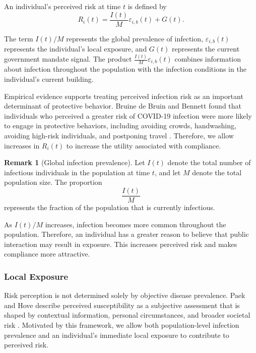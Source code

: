 \documentclass[11pt]{article}
\theoremstyle{definition}
\newtheorem{remark}{Remark}[section]
\theoremstyle{plain}
\begin{document}
An individual's perceived risk at time $t$ is defined by
\begin{equation}\label{eq:risk}
 R_i(t)=\frac{I(t)}{M}\varepsilon_{i,b}(t)+G(t).
\end{equation}

The term $I(t)/M$ represents the global prevalence of infection, $\varepsilon_{i,b}(t)$ represents the individual's local exposure, and $G(t)$ represents the current government mandate signal. The product $\frac{I(t)}{M}\varepsilon_{i,b}(t)$ combines information about infection throughout the population with the infection conditions in the individual's current building.

Empirical evidence supports treating perceived infection risk as an important
determinant of protective behavior. Bruine de Bruin and Bennett found that
individuals who perceived a greater risk of COVID-19 infection were more
likely to engage in protective behaviors, including avoiding crowds,
handwashing, avoiding high-risk individuals, and postponing travel
\cite{bruine2020}. Therefore, we allow increases in $R_i(t)$ to increase
the utility associated with compliance.

\begin{remark}[Global infection prevalence]
\label{rem:prevalence}
Let $I(t)$ denote the total number of infectious individuals in the population at time $t$, and let $M$ denote the total population size. The proportion
\[
\frac{I(t)}{M}
\]
represents the fraction of the population that is currently infectious.

As $I(t)/M$ increases, infection becomes more common throughout the population. Therefore, an individual has a greater reason to believe that public interaction may result in exposure. This increases perceived risk and makes compliance more attractive.
\end{remark}

\subsubsection{Local Exposure}

Risk perception is not determined solely by objective disease prevalence.
Paek and Hove describe perceived susceptibility as a subjective assessment
that is shaped by contextual information, personal circumstances, and broader
societal risk \cite{paek2017}. Motivated by this framework, we allow both
population-level infection prevalence and an individual's immediate local
exposure to contribute to perceived risk.
\end{document}
